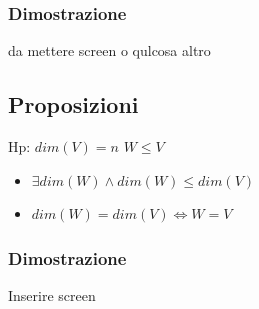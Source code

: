 \documentclass{article}
\begin{document}
\subsubsection*{Dimostrazione}
da mettere screen o qulcosa altro

\subsection*{Proposizioni}
\begin{flushleft}
  Hp: $dim(V)=n$ $W \leq V$
\end{flushleft}
\begin{itemize}
  \item $ \exists dim(W) \land dim(W)\leq dim(V)$
  \item $dim(W)=dim(V) \iff W=V$
\end{itemize}
\subsubsection*{Dimostrazione}
Inserire screen
\end{document}
